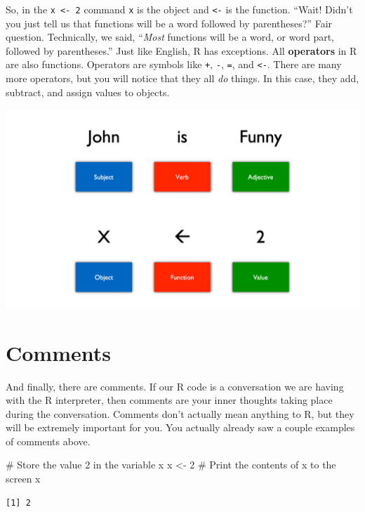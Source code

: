 \documentclass[
  letterpaper,
  DIV=11,
  numbers=noendperiod]{scrreprt}
\newenvironment{Shaded}{\begin{snugshade}}{\end{snugshade}}
\newcommand{\CommentTok}[1]{\textcolor[rgb]{0.37,0.37,0.37}{#1}}
\newcommand{\DecValTok}[1]{\textcolor[rgb]{0.68,0.00,0.00}{#1}}
\newcommand{\NormalTok}[1]{\textcolor[rgb]{0.00,0.23,0.31}{#1}}
\newcommand{\OtherTok}[1]{\textcolor[rgb]{0.00,0.23,0.31}{#1}}
\begin{document}
So, in the \texttt{x\ \textless{}-\ 2} command \texttt{x} is the object
and \texttt{\textless{}-} is the function. ``Wait! Didn't you just tell
us that functions will be a word followed by parentheses?'' Fair
question. Technically, we said, ``\emph{Most} functions will be a word,
or word part, followed by parentheses.'' Just like English, R has
exceptions. All \textbf{operators} in R are also functions. Operators
are symbols like \texttt{+}, \texttt{-}, \texttt{=}, and
\texttt{\textless{}-}. There are many more operators, but you will
notice that they all \emph{do} things. In this case, they add, subtract,
and assign values to objects.

\includegraphics{chapters/speaking_r/language.png}

\section{Comments}\label{comments}

And finally, there are comments. If our R code is a conversation we are
having with the R interpreter, then comments are your inner thoughts
taking place during the conversation. Comments don't actually mean
anything to R, but they will be extremely important for you. You
actually already saw a couple examples of comments above.

\begin{Shaded}
\begin{Highlighting}[]
\CommentTok{\# Store the value 2 in the variable x}
\NormalTok{x }\OtherTok{\textless{}{-}} \DecValTok{2}
\CommentTok{\# Print the contents of x to the screen}
\NormalTok{x}
\end{Highlighting}
\end{Shaded}

\begin{verbatim}
[1] 2
\end{verbatim}
\end{document}
